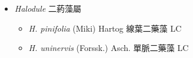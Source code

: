 
  \begin{itemize}
 \item[] \textit{Halodule} 二葯藻屬
                                
  \begin{itemize}
        \item[] \textit{H. pinifolia} (Miki) Hartog  線葉二藥藻   LC
        \item[] \textit{H. uninervis} (Forssk.) Asch.  單脈二藥藻   LC
  \end{itemize}
  \end{itemize}
